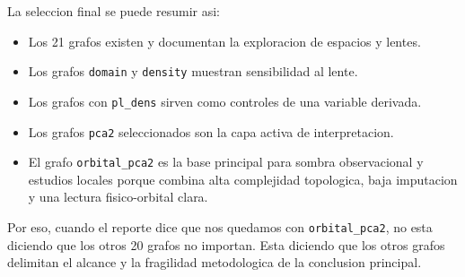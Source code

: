 La seleccion final se puede resumir asi:

\begin{itemize}
    \item Los 21 grafos existen y documentan la exploracion de espacios y lentes.
    \item Los grafos \texttt{domain} y \texttt{density} muestran sensibilidad al lente.
    \item Los grafos con \texttt{pl\_dens} sirven como controles de una variable derivada.
    \item Los grafos \texttt{pca2} seleccionados son la capa activa de interpretacion.
    \item El grafo \texttt{orbital\_pca2} es la base principal para sombra observacional y estudios locales porque combina alta complejidad topologica, baja imputacion y una lectura fisico-orbital clara.
\end{itemize}

Por eso, cuando el reporte dice que nos quedamos con \texttt{orbital\_pca2}, no esta diciendo que los otros 20 grafos no importan. Esta diciendo que los otros grafos delimitan el alcance y la fragilidad metodologica de la conclusion principal.
